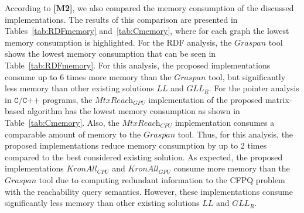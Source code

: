 According to \textbf{[M2]}, we also compared the memory consumption of the discussed implementations. The results of this comparison are presented in Tables~\ref{tab:RDFmemory} and~\ref{tab:Cmemory}, where for each graph the lowest memory consumption is highlighted. For the RDF analysis, the $\textit{Graspan}$ tool shows the lowest memory consumption that can be seen in Table~\ref{tab:RDFmemory}. For this analysis, the proposed implementations consume up to 6 times more memory than the $\textit{Graspan}$ tool, but significantly less memory than other existing solutions $\textit{LL}$ and $\textit{GLL}_{\textit{R}}$. For the pointer analysis in $\texttt{C/C++}$ programs, the $\textit{MtxReach}_{\textit{GPU}}$ implementation of the proposed matrix-based algorithm has the lowest memory consumption as shown in Table~\ref{tab:Cmemory}. Also, the $\textit{MtxReach}_{\textit{CPU}}$ implementation consumes a comparable amount of memory to the $\textit{Graspan}$ tool. Thus, for this analysis, the proposed implementations reduce memory consumption by up to 2 times compared to the best considered existing solution. As expected, the proposed implementations $\textit{KronAll}_{\textit{CPU}}$ and $\textit{KronAll}_{\textit{GPU}}$ consume more memory than the $\textit{Graspan}$ tool due to computing redundant information to the CFPQ problem with the reachability query semantics. However, these implementations consume significantly less memory than other existing solutions $\textit{LL}$ and $\textit{GLL}_{\textit{R}}$.

